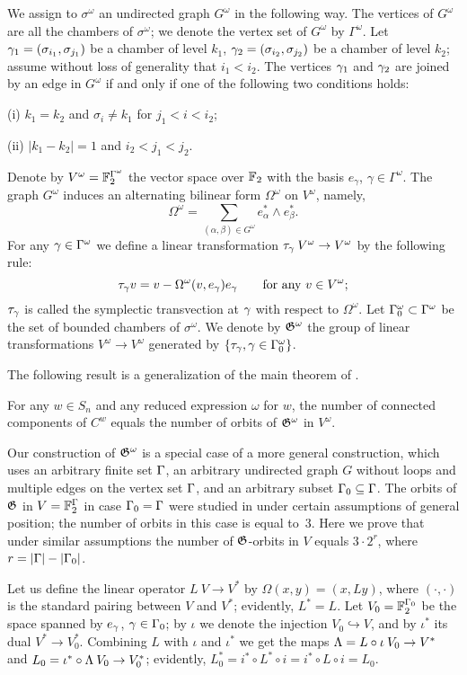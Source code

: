 We assign to $\sigma^\omega$ an undirected graph $G^\omega$ in the following 
way. The vertices of $G^\omega$ are all the chambers of $\sigma^\omega$;
we denote the vertex set of $G^\omega$ by $\Gamma^\omega$. 
Let ${\gamma}_1=(\sigma_{i_1},\sigma_{j_1})$
be a chamber of level $k_1$,  ${\gamma}_2=(\sigma_{i_2},\sigma_{j_2})$
be a chamber of level $k_2$; assume without loss of generality 
that $i_1<i_2$. The vertices
${\gamma}_1$ and ${\gamma}_2$ are joined  by an edge in $G^\omega$ if and only if one of 
the following two conditions holds:

(i) $k_1=k_2$ and $\sigma_i\ne k_1$ for $j_1<i<i_2$;

(ii) $|k_1-k_2|=1$ and $i_2<j_1<j_2$.

Denote by $V^\omega=\Bbb F_2^{\Gamma^\omega}$
the vector space over $\Bbb F_2$ with the basis $e_\gamma$, 
$\gamma\in\Gamma^\omega$. The graph $G^\omega$ induces an alternating 
bilinear form $\Omega^\omega$ on $V^\omega$, namely, 
$$
\Omega^\omega=\sum_{(\alpha,\beta)\in G^\omega}e^*_\alpha\wedge e^*_\beta.
$$
For any ${\gamma}\in\Gamma^\omega$ we define a linear transformation 
$\tau_{\gamma}\: V^\omega\to V^\omega$ by the following rule:
$$
\tau_{\gamma} v=v-\Omega^\omega(v,e_{\gamma})e_{\gamma}\qquad\text{for any $v\in V^\omega$};
$$
$\tau_{\gamma}$ is called the symplectic transvection at ${\gamma}$ with respect to 
$\Omega^\omega$.
Let $\Gamma_0^\omega\subset\Gamma^\omega$ be the set of bounded chambers of 
$\sigma^\omega$. We denote by $\frak G^\omega$ the group
of linear transformations $V^\omega\to V^\omega$ generated by 
$\{\tau_{\gamma}, {\gamma}\in\Gamma_0^\omega\}$. 
  
The following result is a generalization of the main theorem of \cite{SSV2}.

 For any $w\in S_n$ and any reduced expression 
$\omega$ for $w$, the number 
of connected components of $C^w$ equals the number of orbits of 
$\frak G^\omega$ in $V^\omega$.
\endproclaim

Our construction of $\frak G^\omega$ is a special case of a more general 
construction, which uses an arbitrary finite set $\Gamma$, an arbitrary undirected
graph $G$ without loops and multiple edges on the vertex set $\Gamma$, and 
an arbitrary subset $\Gamma_0\subseteq\Gamma$. The orbits of $\frak G$ in $V=\Bbb F_2^\Gamma$ 
in case
$\Gamma_0=\Gamma$ were studied in \cite{Ja} under certain assumptions of
general position; the number of orbits in this case is equal to~$3$. Here we
prove that under similar assumptions the number of $\frak G$-orbits in $V$ 
equals $3\cdot 2^r$, where $r=|\Gamma|-|\Gamma_0|$.

Let us define the linear operator $L\: V\to V^*$ by 
$\Omega(x,y)=(x,Ly)$, where $(\cdot,\cdot)$ is the standard
pairing between $V$ and $V^*$; evidently,  $L^*=L$. Let $V_0=\Bbb F_2^{\Gamma_0}$ 
be the space spanned by $e_{\gamma}$, ${\gamma}\in\Gamma_0$; 
by $\iota$ we denote the injection $V_0\hookrightarrow V$, 
and by $\iota^*$ its dual $V^*\to V_0^*$. Combining $L$ with $\iota$ and 
$\iota^*$ we get the maps $\Lambda=L\circ \iota\:V_0\to V^*$ and 
$L_{0}=\iota^*\circ \Lambda\: V_0\to V_0^*$; evidently, $L_{0}^*=
i^*\circ L^*\circ i=i^*\circ L\circ i=L_{0}$.


